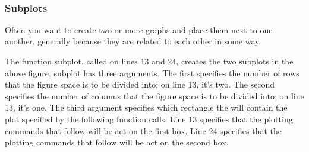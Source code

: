 \documentclass[11pt]{article}
\begin{document}
    \begin{center}
    \end{center}
    { \hspace*{\fill} \\}
    
    \hypertarget{subplots}{%
\subsubsection{Subplots}\label{subplots}}

Often you want to create two or more graphs and place them next to one
another, generally because they are related to each other in some way.

The function subplot, called on lines 13 and 24, creates the two
subplots in the above figure. subplot has three arguments. The first
specifies the number of rows that the figure space is to be divided
into; on line 13, it's two. The second specifies the number of columns
that the figure space is to be divided into; on line 13, it's one. The
third argument specifies which rectangle the will contain the plot
specified by the following function calls. Line 13 specifies that the
plotting commands that follow will be act on the first box. Line 24
specifies that the plotting commands that follow will be act on the
second box.
\end{document}

